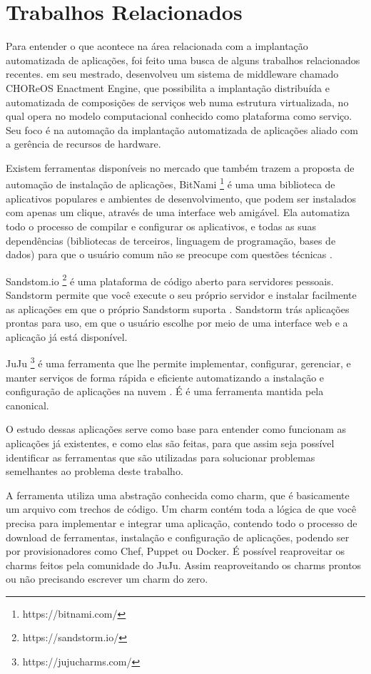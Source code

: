 \section{Trabalhos Relacionados}
\label{section:trabalhos_relacionados}

Para entender o que acontece na área relacionada com a implantação
automatizada de aplicações, foi feito uma busca de alguns trabalhos relacionados recentes.  em seu mestrado,
desenvolveu um sistema de middleware chamado CHOReOS Enactment Engine, que possibilita a implantação distribuída e automatizada de composições
de serviços web numa estrutura virtualizada, no qual opera no modelo
computacional conhecido como plataforma como serviço. Seu foco é na automação da 
implantação automatizada de aplicações aliado com a gerência de recursos de 
hardware.

Existem ferramentas disponíveis no mercado que também trazem a proposta
de automação de instalação de aplicações, BitNami \footnote{https://bitnami.com/} é uma 
uma biblioteca de aplicativos populares e ambientes de desenvolvimento, 
que podem ser instalados com apenas um clique, 
através de uma interface web amigável. Ela automatiza todo o processo de 
compilar e configurar os aplicativos, 
e todas as suas dependências (bibliotecas de terceiros, linguagem de programação, 
bases de dados) para que o usuário comum não se preocupe com questões técnicas . 

Sandstom.io \footnote{https://sandstorm.io/} é uma plataforma de código aberto para servidores
pessoais. Sandstorm permite que você execute o seu próprio servidor e instalar
facilmente as aplicações em que o próprio Sandstorm 
suporta . Sandstorm trás aplicações prontas para uso, em que o usuário escolhe por meio de uma interface web e a aplicação já está disponível.

JuJu \footnote{https://jujucharms.com/} é uma ferramenta que lhe permite 
implementar, configurar, gerenciar, 
e manter serviços de forma rápida e eficiente automatizando a instalação e 
configuração de aplicações na nuvem \cite{juju}. É 
é uma ferramenta mantida pela canonical. 

O estudo dessas aplicações serve como base para entender como funcionam as aplicações
já existentes, e como elas são feitas, para que assim seja possível identificar
as ferramentas que são utilizadas para solucionar problemas semelhantes ao problema deste
trabalho. 

A ferramenta  utiliza uma abstração conhecida como charm,
que é basicamente um arquivo com trechos de código. Um charm
contém toda a lógica de que você precisa para implementar e integrar uma aplicação,
contendo todo o processo de download de ferramentas, instalação e configuração de
aplicações, podendo ser por provisionadores como Chef, Puppet ou Docker. 
É possível reaproveitar os charms feitos pela comunidade do JuJu. Assim
reaproveitando os charms prontos ou não precisando escrever um charm do zero.

